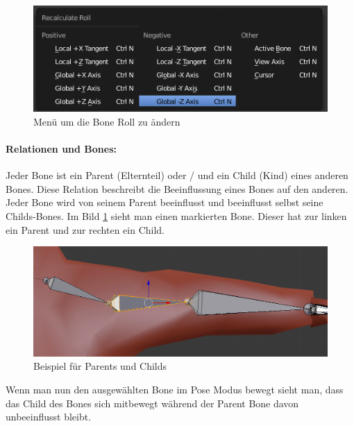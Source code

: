 \begin{figure}[H]
    \centering

    \includegraphics[width=.8\textwidth]{images/bone_roll_recalculate.png}
    \caption{Menü um die Bone Roll zu ändern}
\end{figure}

\paragraph{Relationen und Bones:}
Jeder Bone ist ein Parent (Elternteil) oder / und ein Child (Kind) eines anderen Bones.
Diese Relation beschreibt die Beeinflussung eines Bones auf den anderen. Jeder Bone wird von seinem Parent beeinflusst und beeinflusst selbst seine Childs-Bones.
Im Bild \ref{Rigging:ParentChild} sieht man einen markierten Bone. Dieser hat zur linken ein Parent und zur rechten ein Child.
\citep{Blender:boneRelations}

\begin{figure}[H]
    \centering

    \includegraphics[width=.8\textwidth]{images/bone_parent_child.png}
    \caption{Beispiel für Parents und Childs}
    \label{Rigging:ParentChild}
\end{figure}

Wenn man nun den ausgewählten Bone im Pose Modus bewegt sieht man, dass das Child des Bones sich mitbewegt während der Parent Bone davon unbeeinflusst bleibt.

